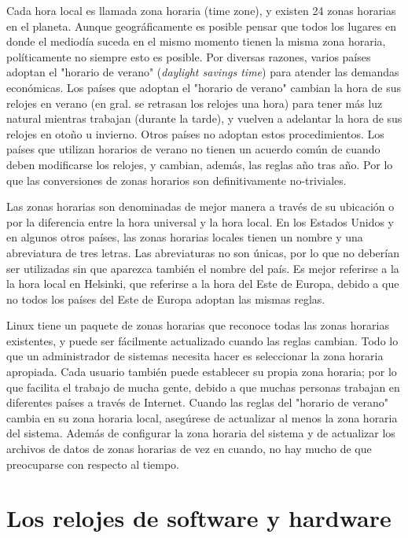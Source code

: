 Cada hora local es llamada zona horaria (time zone), y existen 24 zonas horarias
en el planeta. Aunque geográficamente es posible pensar que todos los lugares
en donde el mediodía suceda en el mismo momento tienen la misma zona horaria,
políticamente no siempre esto es posible. Por diversas razones, varios países
adoptan el "horario de verano" (\textit{daylight savings time}) para atender las demandas
económicas. Los países que adoptan el "horario de verano" cambian la hora
de sus relojes en verano (en gral. se retrasan los relojes una hora) para
tener más luz natural mientras trabajan (durante la tarde), y vuelven a adelantar
la hora de sus relojes en otoño u invierno. Otros países no adoptan estos procedimientos.
Los países que utilizan horarios de verano no tienen un acuerdo común de cuando deben
modificarse los relojes, y cambian, además, las reglas año tras año. Por lo que las
conversiones de zonas horarios son definitivamente no-triviales.



Las zonas horarias son denominadas de mejor manera a través de su ubicación o por
la diferencia entre la hora universal y la hora local. En los Estados Unidos y
en algunos otros países, las zonas horarias locales tienen un nombre y una abreviatura
de tres letras. Las abreviaturas no son únicas, por lo que no deberían
ser utilizadas sin que aparezca también el nombre del país. Es mejor referirse a la
la hora local en Helsinki, que referirse a la hora del Este de Europa, debido a que
no todos los países del Este de Europa adoptan las mismas reglas.



Linux tiene un paquete de zonas horarias que reconoce todas las zonas horarias existentes,
y puede ser fácilmente actualizado cuando las reglas cambian. Todo lo que un administrador de 
sistemas necesita hacer es seleccionar la zona horaria apropiada. Cada usuario también
puede establecer su propia zona horaria; por lo que facilita el trabajo de mucha gente,
debido a que muchas personas trabajan en diferentes países a través de Internet.
Cuando las reglas del "horario de verano" cambia en su zona horaria local, asegúrese
de actualizar al menos la zona horaria del sistema. Además de configurar la zona horaria
del sistema y de actualizar los archivos de datos de zonas horarias de vez en cuando, 
no hay mucho de que preocuparse con respecto al tiempo.




\section{
Los relojes de software y hardware}


